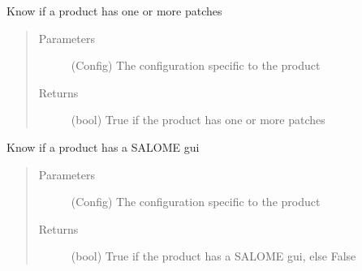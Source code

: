 \documentclass[a4paper,10pt,english]{sphinxmanual}
\begin{document}
\begin{fulllineitems}
\label{\detokenize{apidoc_src/src:src.product.product_has_patches}}
Know if a product has one or more patches
\begin{quote}\begin{description}
\item[{Parameters}] \leavevmode
{} \textendash{} (Config)
The configuration specific to the product

\item[{Returns}] \leavevmode
(bool) 
True if the product has one or more patches

\end{description}\end{quote}

\end{fulllineitems}


\begin{fulllineitems}
\label{\detokenize{apidoc_src/src:src.product.product_has_salome_gui}}
Know if a product has a SALOME gui
\begin{quote}\begin{description}
\item[{Parameters}] \leavevmode
{} \textendash{} (Config)
The configuration specific to the product

\item[{Returns}] \leavevmode
(bool) 
True if the product has a SALOME gui, else False

\end{description}\end{quote}

\end{fulllineitems}

\end{document}
